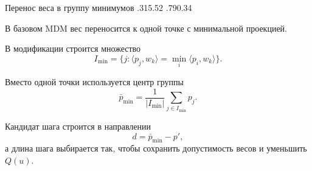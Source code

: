\SPBGSplitSlide
  {Перенос веса в группу минимумов}
  {.315}{.52}
  {%
    \ReportGroupStep
  }
  {.790}{.34}
  {%
    \SplitBody
    В базовом MDM вес переносится к одной точке с минимальной проекцией.

    \vspace{.22cm}
    В модификации строится множество
    \[
      I_{\min}=\{j:\langle p_j,w_k\rangle
      =\min_i\langle p_i,w_k\rangle\}.
    \]

    Вместо одной точки используется центр группы
    \[
      \bar p_{\min}
      =\frac1{|I_{\min}|}\sum_{j\in I_{\min}}p_j.
    \]

    Кандидат шага строится в направлении
    \[
      d=\bar p_{\min}-p',
    \]
    а длина шага выбирается так, чтобы сохранить допустимость весов и
    уменьшить \(Q(u)\).
  }
